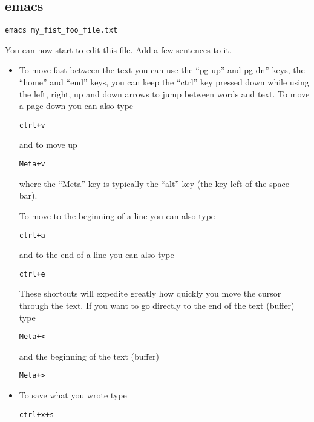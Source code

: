 \documentclass[aps,showpacs,prd,notitlepage,preprintnumbers,amsmath,amssymb,letterpaper]{revtex4}
\begin{document}
\subsection{emacs}
\begin{verbatim}
emacs my_fist_foo_file.txt
\end{verbatim}

You can now start to edit this file. Add a few sentences to it.
\begin{itemize}

\item To move fast between the text you can use the ``pg up'' and pg
  dn'' keys, the ``home'' and ``end'' keys, you can keep the ``ctrl''
  key pressed down while using the left, right, up and down arrows to jump
  between words and text. To move a page down you can also type

\begin{verbatim}
ctrl+v
\end{verbatim}

and to move up

\begin{verbatim}
Meta+v
\end{verbatim}

where the ``Meta'' key is typically the ``alt'' key (the key left of the space bar).

To move to the beginning of a line you can also type
\begin{verbatim}
ctrl+a
\end{verbatim}

and to the end of a line you can also type
\begin{verbatim}
ctrl+e
\end{verbatim}


These shortcuts will expedite greatly how quickly you move the cursor
through the text. If you want to go directly to the end of the text (buffer)
type

\begin{verbatim}
Meta+<
\end{verbatim}

and the beginning of the text (buffer)

\begin{verbatim}
Meta+>
\end{verbatim}

  
\item To save what you wrote type 

\begin{verbatim}
ctrl+x+s
\end{verbatim}


\end{itemize}
\end{document}
